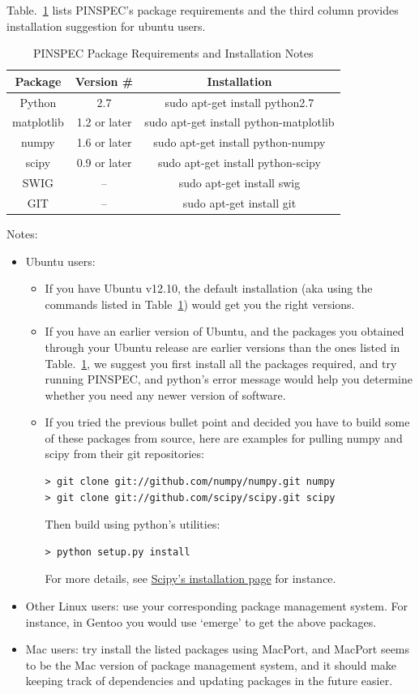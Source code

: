 \documentclass[titlepage]{article}
\begin{document}
Table.~\ref{install-table} lists PINSPEC's package requirements and the third column provides installation suggestion for ubuntu users. 
\begin{table}[h]
  \centering
  \begin{tabular}{|c|c|c|} \hline
    Package & Version \# & Installation \\ \hline \hline
    Python & 2.7 & sudo apt-get install python2.7 \\ \hline
    matplotlib & 1.2 or later & sudo apt-get install python-matplotlib \\ \hline
    numpy & 1.6 or later & sudo apt-get install python-numpy \\ \hline
    scipy & 0.9 or later & sudo apt-get install python-scipy \\ \hline
    SWIG & -- &  sudo apt-get install swig \\ \hline
    GIT & -- & sudo apt-get install git \\ \hline
  \end{tabular} 
  \caption{PINSPEC Package Requirements and Installation Notes} \label{install-table}
\end{table}
Notes:
\begin{itemize}
\item Ubuntu users: 
\begin{itemize}
\item If you have Ubuntu v12.10, the default installation (aka using the commands listed in Table~\ref{install-table}) would get you the right versions. 
\item If you have an earlier version of Ubuntu, and the packages you obtained through your Ubuntu release are earlier versions than the ones listed in Table.~\ref{install-table}, we suggest you first install all the packages required, and try running PINSPEC, and python's error message would help you determine whether you need any newer version of software. 
\item If you tried the previous bullet point and decided you have to build some of these packages from source, here are examples for pulling numpy and scipy from their git repositories: 
\begin{verbatim}
> git clone git://github.com/numpy/numpy.git numpy 
> git clone git://github.com/scipy/scipy.git scipy
\end{verbatim}
Then build using python's utilities:
\begin{verbatim}
> python setup.py install
\end{verbatim}
For more details, see \href{http://scipy.org/Installing_SciPy/BuildingGeneral}{Scipy's installation page} for instance. 
\end{itemize}

\item Other Linux users: use your corresponding package management system. For instance, in Gentoo you would use `emerge' to get the above packages. 

\item Mac users: try install the listed packages using MacPort, and MacPort seems to be the Mac version of package management system, and it should make keeping track of dependencies and updating packages in the future easier. 
\end{itemize}
\end{document}
